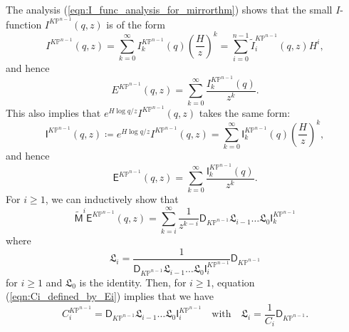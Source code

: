 \documentclass[12pt]{amsart}
\numberwithin{equation}{section}
\newcommand{\KP}{K\mathbb{P}}
\begin{document}
The analysis (\ref{eqn:I_func_analysis_for_mirrorthm}) shows that the small $I$-function ${I}^{\KP^{n-1}}(q,z)$ is of the form
\begin{equation}\label{eqn:}
{I}^{\KP^{n-1}}(q,z)=\sum_{k=0}^\infty {I}^{\KP^{n-1}}_k(q)\left(\frac{H}{z}\right)^k=\sum_{i=0}^{n-1}\tilde{{I}}^{\KP^{n-1}}_i(q,z)H^i,
\end{equation}
and hence
\begin{equation*}
E^{\KP^{n-1}}(q,z)=\sum_{k=0}^\infty \frac{{I}^{\KP^{n-1}}_k(q)}{z^k}.
\end{equation*}
This also implies that $e^{H\log q/z}I^{\KP^{n-1}}(q,z)$ takes the same form:
\begin{equation}\label{eqn:formula_for_mathsfI}
\mathsf{I}^{\KP^{n-1}}(q,z)\coloneqq e^{H\log q/z}I^{\KP^{n-1}}(q,z)=\sum_{k=0}^\infty \mathsf{I}_k^{\KP^{n-1}}(q)\left(\frac{H}{z}\right)^k,
\end{equation}
and hence
\begin{equation}\label{eqn:E_function_as_a_sum_of_Iks}
\mathsf{E}^{\KP^{n-1}}(q,z)=\sum_{k=0}^\infty \frac{\mathsf{I}^{\KP^{n-1}}_k(q)}{z^k}.
\end{equation}
For $i\geq 1$, we can inductively show that
\begin{equation*}
\widetilde{\mathsf{M}}^i\mathsf{E}^{\KP^{n-1}}(q,z)=\sum_{k=i}^{\infty}\frac{1}{z^{k-i}}\mathsf{D}_{K\mathbb{P}^{n-1}}{{\mathfrak{L}}}_{i-1}\ldots{\mathfrak{L}}_0\mathsf{I}^{\KP^{n-1}}_k
\end{equation*}
where
$${\mathfrak{L}}_i=\frac{1}{\mathsf{D}_{K\mathbb{P}^{n-1}}{{\mathfrak{L}}}_{i-1}\ldots{\mathfrak{L}}_0\mathsf{I}^{\KP^{n-1}}_i}\mathsf{D}_{K\mathbb{P}^{n-1}}$$ 
for $i\geq 1$ and ${\mathfrak{L}}_0$ is the identity.
Then, for $i\geq 1$, equation (\ref{eqn:Ci_defined_by_Ei}) implies that we have
\begin{equation}\label{eqn:mathrfrak_L_operator_dfn_of_C_i}
C_i^{\KP^{n-1}}=\mathsf{D}_{K\mathbb{P}^{n-1}}{{\mathfrak{L}}}_{i-1}\ldots{\mathfrak{L}}_0\mathsf{I}^{\KP^{n-1}}_i\quad\text{with}\quad {\mathfrak{L}}_i=\frac{1}{C_i}\mathsf{D}_{K\mathbb{P}^{n-1}}.
\end{equation}
\end{document}
